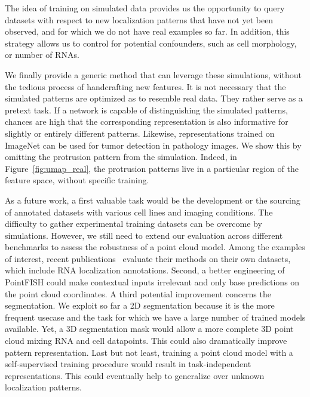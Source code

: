The idea of training on simulated data provides us the opportunity to query datasets with respect to new localization patterns that have not yet been observed, and for which we do not have real examples so far.
In addition, this strategy allows us to control for potential confounders, such as cell morphology, or number of \ac{RNA}s.

We finally provide a generic method that can leverage these simulations, without the tedious process of handcrafting new features.
It is not necessary that the simulated patterns are optimized as to resemble real data.
They rather serve as a pretext task.
If a network is capable of distinguishing the simulated patterns, chances are high that the corresponding representation is also informative for slightly or entirely different patterns.
Likewise, representations trained on ImageNet can be used for tumor detection in pathology images.
We show this by omitting the protrusion pattern from the simulation.
Indeed, in Figure~\ref{fig:umap_real}, the protrusion patterns live in a particular region of the feature space, without specific training.


As a future work, a first valuable task would be the development or the sourcing of annotated datasets with various cell lines and imaging conditions.
The difficulty to gather experimental training datasets can be overcome by simulations.
However, we still need to extend our evaluation across different benchmarks to assess the robustness of a point cloud model.
Among the examples of interest, recent publications~\cite{savulescu_interrogating_2021,mah_bento_2022} evaluate their methods on their own datasets, which include \ac{RNA} localization annotations.
Second, a better engineering of PointFISH could make contextual inputs irrelevant and only base predictions on the point cloud coordinates.
A third potential improvement concerns the segmentation.
We exploit so far a 2D segmentation because it is the more frequent usecase and the task for which we have a large number of trained models available.
Yet, a 3D segmentation mask would allow a more complete 3D point cloud mixing \ac{RNA} and cell datapoints.
This could also dramatically improve pattern representation.
Last but not least, training a point cloud model with a self-supervised training procedure would result in task-independent representations.
This could eventually help to generalize over unknown localization patterns.

